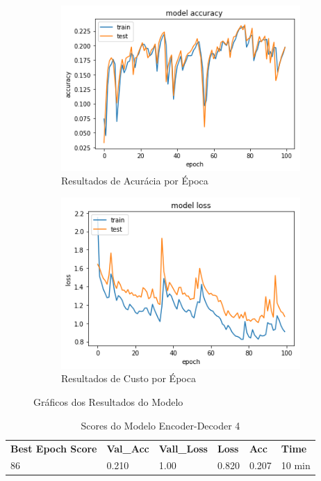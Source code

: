 \begin{figure}[h]
  \centering
  \begin{subfigure}[b]{0.45\linewidth}
    \includegraphics[width=\linewidth]{img/enc-dec-4.png}
    \caption{Resultados de Acurácia por Época}
  \end{subfigure}
  \begin{subfigure}[b]{0.45\linewidth}
    \includegraphics[width=\linewidth]{img/enc-dec-4-loss.png}
    \caption{Resultados de Custo por Época}
  \end{subfigure}
  \caption{Gráficos dos Resultados do Modelo}
  \label{fig:plots4}
\end{figure}

\begin{table}[h]
\centering
\begin{tabular}{llllll}
\textbf{Best Epoch Score} & \textbf{Val\_Acc} & \textbf{Vall\_Loss} & \textbf{Loss} & \textbf{Acc} & \textbf{Time} \\
86 & 0.210 & 1.00 & 0.820 & 0.207 & 10 min
\end{tabular}
\caption{Scores do Modelo Encoder-Decoder 4}
\label{tab:res-enc-dec-4}
\end{table}


